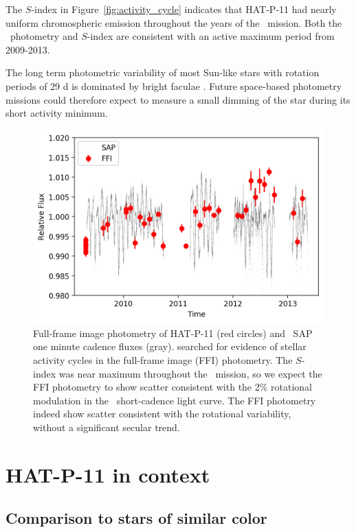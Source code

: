 The $S$-index in Figure~\ref{fig:activity_cycle} indicates that HAT-P-11 had nearly uniform chromospheric emission throughout the years of the \kepler\ mission. Both the \kepler\ photometry and $S$-index are consistent with an active maximum period from 2009-2013.

The long term photometric variability of most Sun-like stars with rotation periods of 29 d is dominated by bright faculae \citep{Montet2017}. Future space-based photometry missions could therefore expect to measure a small dimming of the star during its short activity minimum.

\begin{figure}
\begin{center}
\includegraphics[scale=0.8]{sindex/ffi.png}
\end{center}
\caption{Full-frame image photometry of HAT-P-11 (red circles) and \kepler\ SAP one minute cadence fluxes (gray). \citet{Montet2017} searched for evidence of stellar activity cycles in the full-frame image (FFI) photometry. The $S$-index was near maximum throughout the \kepler\ mission, so we expect the FFI photometry to show scatter consistent with the 2\% rotational modulation in the \kepler\ short-cadence light curve. The FFI photometry indeed show scatter consistent with the rotational variability, without a significant secular trend.}
\label{fig:ffi}
\end{figure}

\section{HAT-P-11 in context} \label{sec:cks}

\subsection{Comparison to stars of similar color} \label{sec:mittag}

